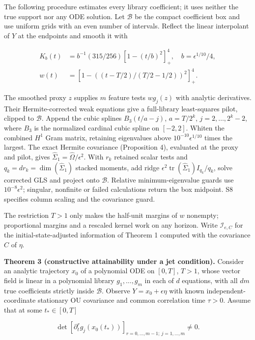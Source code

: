 \documentclass[ejs]{imsart}
\newcounter{none}
\begin{document}
The following procedure estimates every library coefficient; it uses
neither the true support nor any ODE solution. Let \(\mathcal B\) be the
compact coefficient box and use uniform grids with an even number of
intervals. Reflect the linear interpolant of \(Y\) at the endpoints and
smooth it with

\[
\begin{aligned}
K_b(t)&=b^{-1}(315/256)[1-(t/b)^2]_+^4,\quad b=\epsilon^{1/10}/4,\\
w(t)&=[1-((t-T/2)/(T/2-1/2))^2]_+^4.
\end{aligned}
\]

The smoothed proxy \(z\) supplies \(m\) feature tests \(w g_j(z)\) with
analytic derivatives. Their Hermite-corrected weak equations give a
full-library least-squares pilot, clipped to \(\mathcal B\). Append the
cubic splines \(B_3(t/a-j)\), \(a=T/2^k\), \(j=2,\ldots,2^k-2\), where
\(B_3\) is the normalized cardinal cubic spline on \([-2,2]\). Whiten
the combined \(H^1\) Gram matrix, retaining eigenvalues above
\(10^{-10}\epsilon^{1/10}\) times the largest. The exact Hermite
covariance (Proposition 4), evaluated at the proxy and pilot, gives
\(\widehat\Sigma_1=\widehat\Omega/\epsilon^2\). With \(r_k\) retained
scalar tests and \(q_k=d r_k=\dim(\widehat\Sigma_1)\) stacked moments,
add ridge \(\epsilon^2\operatorname{tr}(\widehat\Sigma_1)I_{q_k}/q_k\),
solve corrected GLS and project onto \(\mathcal B\). Relative
minimum-eigenvalue guards use \(10^{-8}\epsilon^2\); singular, nonfinite
or failed calculations return the box midpoint. S8 specifies column
scaling and the covariance guard.

The restriction \(T>1\) only makes the half-unit margins of \(w\)
nonempty; proportional margins and a rescaled kernel work on any
horizon. Write \(\mathcal I_{e,C}\) for the initial-state-adjusted
information of Theorem 1 computed with the covariance \(C\) of \(\eta\).

\textbf{Theorem 3 (constructive attainability under a jet condition).}
Consider an analytic trajectory \(x_0\) of a polynomial ODE on
\([0,T]\), \(T>1\), whose vector field is linear in a polynomial library
\(g_1,\ldots,g_m\) in each of \(d\) equations, with all \(dm\) true
coefficients strictly inside \(\mathcal B\). Observe
\(Y=x_0+\epsilon\eta\) with known independent-coordinate stationary OU
covariance and common correlation time \(\tau>0\). Assume that at some
\(t_*\in[0,T]\)

\[
\det[\partial_t^r g_j(x_0(t_*))]_{r=0,\ldots,m-1;\ j=1,\ldots,m}\ne0.
\]
\end{document}
